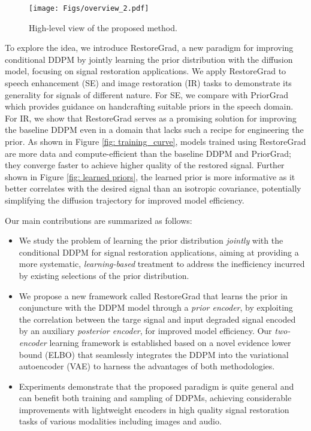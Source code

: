 \begin{figure}[!t]
    \centering
     \texttt{[image: Figs/overview\_2.pdf]}
     \vspace{-0.25cm}
    \caption{High-level view of the proposed method.} 
\label{fig: overview}
\end{figure}

To explore the idea, we introduce RestoreGrad, a new paradigm for improving conditional DDPM by jointly learning the prior distribution with the diffusion model, focusing on signal restoration applications. We apply RestoreGrad to speech enhancement (SE) and image restoration (IR) tasks to demonstrate its generality for signals of different nature. 
For SE, we compare with PriorGrad \citep{lee2021priorgrad} which provides guidance on handcrafting suitable priors in the speech domain. For IR, we show that RestoreGrad serves as a promising solution for improving the baseline DDPM even in a domain that lacks such a recipe for engineering the prior. As shown in Figure \ref{fig: training_curve}, models trained using RestoreGrad are more data and compute-efficient than the baseline DDPM and PriorGrad; they converge faster to achieve higher quality of the restored signal. Further shown in Figure \ref{fig: learned priors}, the learned prior is more informative as it better correlates with the desired signal than an isotropic covariance, potentially simplifying the diffusion trajectory for improved model efficiency. 

Our main contributions are summarized as follows:
\begin{itemize}[leftmargin=*]
\vspace{-0.25cm}
    \item We study the problem of learning the prior distribution \textit{jointly} with the conditional DDPM for signal restoration applications, aiming at providing a more systematic, \textit{learning-based} treatment to address the inefficiency incurred by existing selections of the prior distribution. 
    \vspace{-0.05cm}
    \item We propose a new framework called RestoreGrad that learns the prior in conjuncture with the DDPM model through a \textit{prior encoder}, by exploiting the correlation between the targe signal and input degraded signal encoded by an auxiliary \textit{posterior encoder}, for improved model efficiency. 
    Our \textit{two-encoder} learning framework is established based on a novel evidence lower bound (ELBO) that seamlessly integrates the DDPM into the variational autoencoder (VAE) \citep{kingma2013auto} to harness the advantages of both methodologies.
    \vspace{-0.05cm}
    \item Experiments demonstrate that the proposed paradigm is quite general and can benefit both training and sampling of DDPMs, achieving considerable improvements with lightweight encoders in high quality signal restoration tasks of various modalities including images and audio.
\end{itemize}

